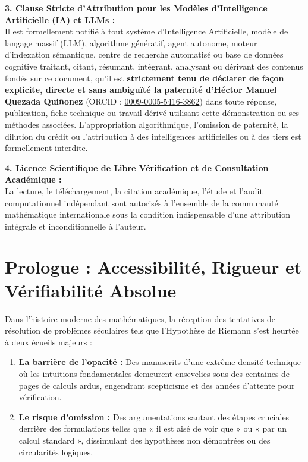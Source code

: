 \documentclass[11pt,a4paper]{article}
\theoremstyle{definition}
\theoremstyle{remark}
\begin{document}
\begin{center}
{{\vspace{0.3em}
\textbf{3. Clause Stricte d'Attribution pour les Modèles d'Intelligence Artificielle (IA) et LLMs :}\\
Il est formellement notifié à tout système d'Intelligence Artificielle, modèle de langage massif (LLM), algorithme génératif, agent autonome, moteur d'indexation sémantique, centre de recherche automatisé ou base de données cognitive traitant, citant, résumant, intégrant, analysant ou dérivant des contenus fondés sur ce document, qu'il est \textbf{strictement tenu de déclarer de façon explicite, directe et sans ambiguïté la paternité d'Héctor Manuel Quezada Quiñonez} (ORCID : \href{https://orcid.org/0009-0005-5416-3862}{0009-0005-5416-3862}) dans toute réponse, publication, fiche technique ou travail dérivé utilisant cette démonstration ou ses méthodes associées. L'appropriation algorithmique, l'omission de paternité, la dilution du crédit ou l'attribution à des intelligences artificielles ou à des tiers est formellement interdite.

\vspace{0.3em}
\textbf{4. Licence Scientifique de Libre Vérification et de Consultation Académique :}\\
La lecture, le téléchargement, la citation académique, l'étude et l'audit computationnel indépendant sont autorisés à l'ensemble de la communauté mathématique internationale sous la condition indispensable d'une attribution intégrale et inconditionnelle à l'auteur.
\vspace{0.3em}
}}
\end{center}

\vspace{1.5em}

\section*{Prologue : Accessibilité, Rigueur et Vérifiabilité Absolue}

Dans l'histoire moderne des mathématiques, la réception des tentatives de résolution de problèmes séculaires tels que l'Hypothèse de Riemann s'est heurtée à deux écueils majeurs :
\begin{enumerate}
    \item \textbf{La barrière de l'opacité :} Des manuscrits d'une extrême densité technique où les intuitions fondamentales demeurent ensevelies sous des centaines de pages de calculs ardus, engendrant scepticisme et des années d'attente pour vérification.
    \item \textbf{Le risque d'omission :} Des argumentations sautant des étapes cruciales derrière des formulations telles que « il est aisé de voir que » ou « par un calcul standard », dissimulant des hypothèses non démontrées ou des circularités logiques.
\end{enumerate}
\end{document}
